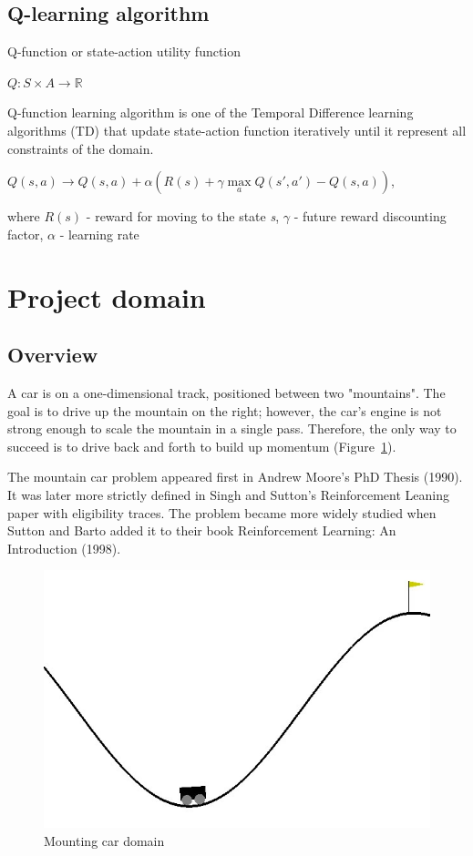 \documentclass[12pt]{article}
\begin{document}
\subsection{Q-learning algorithm}{
Q-function or state-action utility function
\begin{center}
$Q:S \times A \to \mathbb{R}$
\end{center}
Q-function learning algorithm is one of the Temporal Difference learning algorithms (TD) that update state-action function iteratively until it represent all constraints of the domain.
\begin{center}
$Q(s, a) \rightarrow Q(s, a) + \alpha (R(s) + \gamma \max\limits_a Q(s', a') − Q(s, a))$,
\end{center}
where $R(s)$ - reward for moving to the state \textit{s}, $\gamma$ - future reward discounting factor, $\alpha$ - learning rate
}
\newpage
\section{Project domain} 
\subsection{Overview}{A car is on a one-dimensional track, positioned between two "mountains". The goal is to drive up the mountain on the right; however, the car's engine is not strong enough to scale the mountain in a single pass. Therefore, the only way to succeed is to drive back and forth to build up momentum (Figure~\ref{domain_image}).\par
The mountain car problem appeared first in Andrew Moore's PhD Thesis (1990). It was later more strictly defined in Singh and Sutton's Reinforcement Leaning paper with eligibility traces. The problem became more widely studied when Sutton and Barto added it to their book Reinforcement Learning: An Introduction (1998).\par
\begin{figure}[h!]
\begin{center}
\includegraphics[scale=0.5]{images/domain.jpg}
\end{center}
\caption{Mounting car domain}
\label{domain_image}
\end{figure}
}
\end{document}
